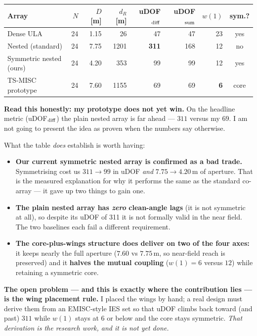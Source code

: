 \documentclass[11pt]{article}
\begin{document}
\begin{center}
\begin{tabular}{@{}lrrrrrrc@{}}
\toprule
\textbf{Array} & \textbf{$N$} & \textbf{$D$ [m]} & \textbf{$d_R$ [m]} & \textbf{uDOF$_{\rm diff}$} &
\textbf{uDOF$_{\rm sum}$} & \textbf{$w(1)$} & \textbf{sym.?} \\
\midrule
Dense ULA               & 24 & 1.15 & 26   & 47  & 47  & 23 & yes \\
Nested (standard)       & 24 & 7.75 & 1201 & \textbf{311} & 168 & 12 & no \\
Symmetric nested (ours) & 24 & 4.20 & 353  & 99  & 99  & 12 & yes \\
TS-MISC prototype       & 24 & 7.60 & 1155 & 69  & 69  & \textbf{6} & core \\
\bottomrule
\end{tabular}
\end{center}

\begin{warnbox}
\textbf{Read this honestly: my prototype does not yet win.} On the headline metric
(uDOF$_{\rm diff}$) the plain nested array is far ahead --- $311$ versus my $69$. I am not going to
present the idea as proven when the numbers say otherwise.

What the table \emph{does} establish is worth having:
\begin{itemize}
\item \textbf{Our current symmetric nested array is confirmed as a bad trade.} Symmetrising cost us
$311\rightarrow 99$ in uDOF \emph{and} $7.75\rightarrow 4.20$\,m of aperture. That is the measured
explanation for why it performs the same as the standard co-array --- it gave up two things to gain
one.
\item \textbf{The plain nested array has \emph{zero} clean-angle lags} (it is not symmetric at all),
so despite its uDOF of 311 it is not formally valid in the near field. The two baselines each fail a
different requirement.
\item \textbf{The core-plus-wings structure does deliver on two of the four axes:} it keeps nearly
the full aperture ($7.60$ vs $7.75$\,m, so near-field reach is preserved) and it \textbf{halves the
mutual coupling} ($w(1)=6$ versus $12$) while retaining a symmetric core.
\end{itemize}
\textbf{The open problem --- and this is exactly where the contribution lies --- is the wing
placement rule.} I placed the wings by hand; a real design must derive them from an EMISC-style IES
set so that uDOF climbs back toward (and past) $311$ while $w(1)$ stays at $6$ or below and the core
stays symmetric. \emph{That derivation is the research work, and it is not yet done.}
\end{warnbox}
\end{document}
